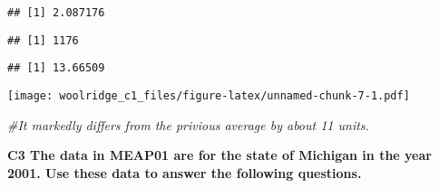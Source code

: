 \documentclass[
]{article}
\newenvironment{Shaded}{\begin{snugshade}}{\end{snugshade}}
\newcommand{\CommentTok}[1]{\textcolor[rgb]{0.56,0.35,0.01}{\textit{#1}}}
\newcommand{\DataTypeTok}[1]{\textcolor[rgb]{0.13,0.29,0.53}{#1}}
\newcommand{\KeywordTok}[1]{\textcolor[rgb]{0.13,0.29,0.53}{\textbf{#1}}}
\newcommand{\NormalTok}[1]{#1}
\newcommand{\OperatorTok}[1]{\textcolor[rgb]{0.81,0.36,0.00}{\textbf{#1}}}
\newcommand{\StringTok}[1]{\textcolor[rgb]{0.31,0.60,0.02}{#1}}
\begin{document}
\begin{verbatim}
## [1] 2.087176
\end{verbatim}

\begin{Shaded}
\end{Shaded}

\begin{verbatim}
## [1] 1176
\end{verbatim}

\begin{Shaded}
\end{Shaded}

\begin{verbatim}
## [1] 13.66509
\end{verbatim}

\begin{Shaded}
\end{Shaded}

\texttt{[image: woolridge\_c1\_files/figure-latex/unnamed-chunk-7-1.pdf]}

\begin{Shaded}
\begin{Highlighting}[]
\CommentTok{#It markedly differs from the privious average by about 11 units.}
\end{Highlighting}
\end{Shaded}

\textbf{C3 The data in MEAP01 are for the state of Michigan in the year
2001. Use these data to answer the following questions.}
\end{document}
